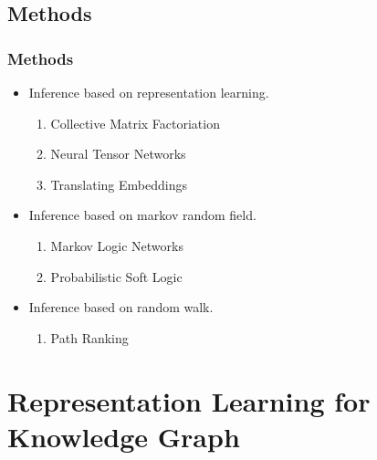 \documentclass[pdf,10pt]{beamer}
\begin{document}
\subsection{Methods}
\begin{frame}
\frametitle{Methods}
\begin{itemize}
	\item Inference based on representation learning.
		\begin{enumerate}
			\item Collective Matrix Factoriation \citep{nickel2011three}
			\item Neural Tensor Networks \citep{socher2013reasoning}
			\item Translating Embeddings\citep{bordes2013translating}
		\end{enumerate}
	\item Inference based on markov random field.
		\begin{enumerate}
			\item Markov Logic Networks \citep{richardson2006markov}
			\item Probabilistic Soft Logic \citep{brocheler2012probabilistic}
		\end{enumerate}
	\item Inference based on random walk.
		\begin{enumerate}
			\item Path Ranking \citep{lao2011random}
		\end{enumerate}
\end{itemize}
\end{frame}

\section{Representation Learning for Knowledge Graph}
\end{document}
